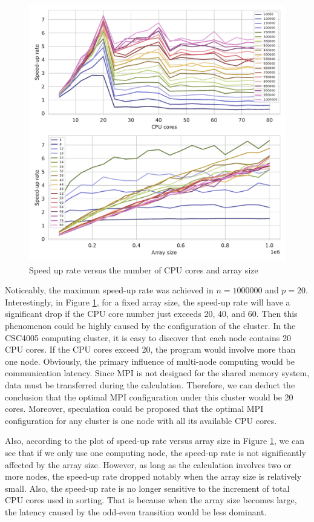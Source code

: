 \documentclass[twoside,12pt]{article}
\theoremstyle{definition}
\theoremstyle{remark}
\begin{document}
\begin{figure}[t!]
    \centering
    \includegraphics[width=\textwidth]{../analysis/rate.pdf}
    \caption{Speed up rate versus the number of CPU cores and array size}
    \label{fig:rate}
\end{figure}

Noticeably, the maximum speed-up rate was achieved in $n=1000000$ and $p=20$.
Interestingly, in Figure \ref{fig:rate}, for a fixed array size,
the speed-up rate will have a significant drop if the CPU core number just exceeds 20, 40, and 60.
Then this phenomenon could be highly caused by the configuration of the cluster.
In the CSC4005 computing cluster, it is easy to discover that each node contains
20 CPU cores.
If the CPU cores exceed 20, the program would involve more than one node.
Obviously, the primary influence of multi-node computing would be communication latency.
Since MPI is not designed for the shared memory system, data must be transferred during the
calculation.
Therefore, we can deduct the conclusion that the optimal MPI configuration
under this cluster would be 20 cores.
Moreover, speculation could be proposed that the optimal MPI configuration
for any cluster is one node with all its available CPU cores.


Also, according to the plot of speed-up rate versus array size in Figure \ref{fig:rate},
we can see that if we only use one computing node, the speed-up rate is not
significantly affected by the array size.
However, as long as the calculation involves two or more nodes, the speed-up rate 
dropped notably when the array size is relatively small.
Also, the speed-up rate is no longer sensitive to the increment of total CPU cores
used in sorting.
That is because when the array size becomes large, the latency caused by
the odd-even transition would be less dominant.
\end{document}
